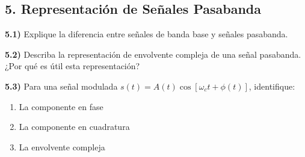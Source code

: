 \subsection*{5. Representación de Señales Pasabanda}

\textbf{5.1)} Explique la diferencia entre señales de banda base y señales pasabanda.

\textbf{5.2)} Describa la representación de envolvente compleja de una señal pasabanda. ¿Por qué es útil esta representación?

\textbf{5.3)} Para una señal modulada \(s(t) = A(t)\cos[\omega_c t + \phi(t)]\), identifique:
\begin{enumerate}[label=\alph*)]
    \item La componente en fase
    \item La componente en cuadratura
    \item La envolvente compleja
\end{enumerate}
